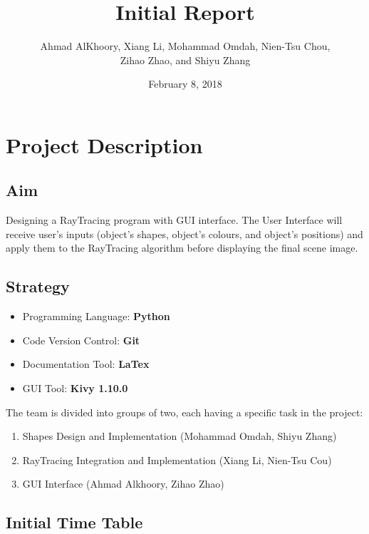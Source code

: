 \documentclass{article}
\title{Initial Report}
\author{Ahmad AlKhoory, Xiang Li, Mohammad Omdah, Nien-Tsu Chou, \\ Zihao Zhao, and Shiyu Zhang}
\date{February 8, 2018}
\begin{document}
\maketitle

\section{Project Description}
\subsection{Aim}

Designing a RayTracing program with GUI interface. The User Interface will receive user's inputs (object's shapes, object's colours, and object's positions) and apply them to the RayTracing algorithm before displaying the final scene image.

\subsection{Strategy}


\begin{itemize}
\item Programming Language: \textbf{Python}
\item Code Version Control: \textbf{Git}
\item Documentation Tool: \textbf{LaTex}
\item GUI Tool: \textbf{Kivy 1.10.0} \\
\end{itemize}

\noindent The team is divided into groups of two, each having a specific task in the project:
\begin{enumerate}
\item Shapes Design and Implementation (Mohammad Omdah, Shiyu Zhang)
\item RayTracing Integration and Implementation (Xiang Li, Nien-Tsu Cou)
\item GUI Interface (Ahmad Alkhoory, Zihao Zhao)
\end{enumerate}


\subsection{Initial Time Table}
\end{document}
